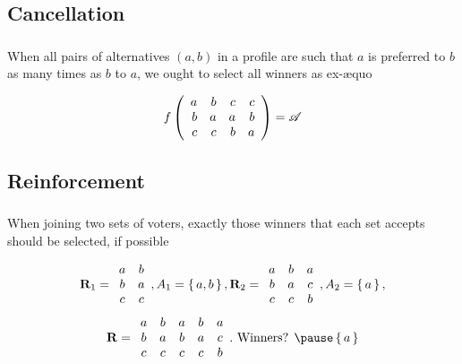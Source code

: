 \documentclass[french,english]{beamer}
\begin{document}
\subsection{Cancellation}
\begin{frame}
	\frametitle{\subsecname}
	\begin{definition}[Cancellation]
		When all pairs of alternatives $(a, b)$ in a profile are such that $a$ is preferred to $b$ as many times as $b$ to $a$, we ought to select all winners as ex-æquo
	\end{definition}
	\begin{example}
		\begin{equation}
			f\left(%
			\begin{array}{rrrr}
				a&b&c&c\\
				b&a&a&b\\
				c&c&b&a\\
			\end{array}\right) = \allalts
		\end{equation}
	\end{example}
\end{frame}

\subsection{Reinforcement}
\begin{frame}
	\frametitle{\subsecname}
	\begin{definition}[\subsecname]
		When joining two sets of voters, exactly those winners that each set accepts should be selected, if possible
	\end{definition}
	\begin{example}
		\begin{equation}
			\mathbf{R}_1 =
			\begin{array}{cc}
				a&b\\
				b&a\\
				c&c\\
			\end{array},
			A_1 = \set{a, b},
			\mathbf{R}_2 =
			\begin{array}{ccc}
				a&b&a\\
				b&a&c\\
				c&c&b\\
			\end{array},
			A_2 = \set{a},
		\end{equation}
		\begin{equation}
			\prof =
			\begin{array}{ccccc}
				a&b&a&b&a\\
				b&a&b&a&c\\
				c&c&c&c&b\\
			\end{array}.
			\text{ Winners? }
			\pause
			\set{a}
		\end{equation}
	\end{example}
\end{frame}
\end{document}
